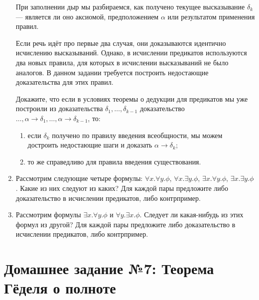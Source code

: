 \documentclass[10pt,a4paper,oneside]{article}
\begin{document}
\begin{enumerate}
При заполнении дыр мы разбираемся, как получено текущее высказывание
$\delta_k$ --- является ли оно аксиомой, предположением $\alpha$ или
результатом применения правил.

Если речь идёт про первые два случая, они доказываются идентично исчислению
высказываний. Однако, в исчислении предикатов используются два новых
правила, для которых в исчислении высказываний не было аналогов.
В данном задании требуется построить недостающие доказательства для этих
правил. 

Докажите, что если в условиях теоремы о дедукции для предикатов
мы уже построили из доказательства $\delta_1, \dots, \delta_{k-1}$
доказательство 
$\dots, \alpha\rightarrow\delta_1, \dots, \alpha\rightarrow\delta_{k-1}$, то:
\begin{enumerate}
\item если $\delta_k$ получено по правилу введения всеобщности, 
мы можем достроить недостающие шаги и доказать $\alpha\rightarrow\delta_k$;
\item то же справедливо для правила введения существования.
\end{enumerate}

\item Рассмотрим следующие четыре формулы: $\forall x.\forall y.\phi$,
$\forall x.\exists y.\phi$, $\exists x.\forall y.\phi$, $\exists x.\exists y.\phi$.
Какие из них следуют из каких? Для каждой пары предложите либо доказательство
в исчислении предикатов, либо контрпример.
\item Рассмотрим формулы $\exists x.\forall y.\phi$ и $\forall y.\exists x.\phi$.
Следует ли какая-нибудь из этих формул из другой?
Для каждой пары предложите либо доказательство в исчислении предикатов, 
либо контрпример.

\end{enumerate}

\section*{Домашнее задание №7: Теорема Гёделя о полноте}
\end{document}
